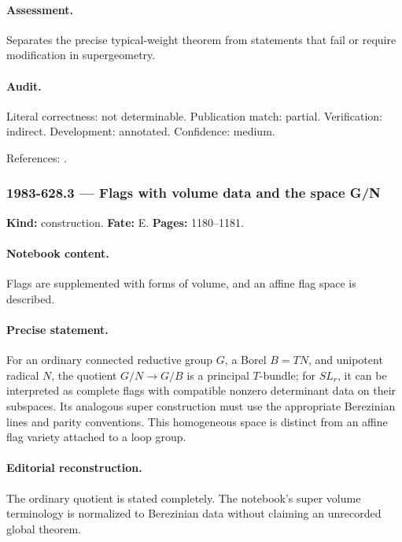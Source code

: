 \paragraph{Assessment.} Separates the precise typical-weight theorem from statements that fail or require modification in supergeometry.

\paragraph{Audit.} Literal correctness: not determinable. Publication match: partial. Verification: indirect. Development: annotated. Confidence: medium.

\noindent References: \citep{penkov1988borel,penkovskornyakov1984borel}.\par

\subsubsection{1983-628.3 --- Flags with volume data and the space G/N}

\label{item:1983-628.3}

\noindent\textbf{Kind:} construction. \textbf{Fate:} E. \textbf{Pages:} 1180--1181.\par

\paragraph{Notebook content.} Flags are supplemented with forms of volume, and an affine flag space is described.

\paragraph{Precise statement.} For an ordinary connected reductive group \(G\), a Borel \(B=TN\), and unipotent radical \(N\), the quotient \(G/N\to G/B\) is a principal \(T\)-bundle; for \(SL_r\), it can be interpreted as complete flags with compatible nonzero determinant data on their subspaces. Its analogous super construction must use the appropriate Berezinian lines and parity conventions. This homogeneous space is distinct from an affine flag variety attached to a loop group.

\paragraph{Editorial reconstruction.} The ordinary quotient is stated completely. The notebook’s super volume terminology is normalized to Berezinian data without claiming an unrecorded global theorem.

